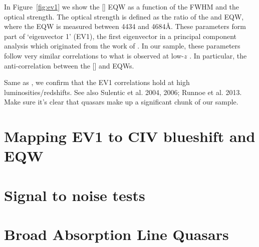 In Figure~\ref{fig:ev1} we show the [] EQW as a function of the \hb FWHM and the optical  strength. 
The optical  strength is defined as the ratio of the  and \hb EQW, where the  EQW is measured between 4434 and 4684\AA.
These parameters form part of `eigenvector 1' (EV1), the first eigenvector in a principal component analysis which originated from the work of \citet{boroson92}.
In our sample, these parameters follow very similar correlations to what is observed at low-$z$ \citep[e.g.][]{shen14}.
In particular, the anti-correlation between the [] and  EQWs.  

Same as \citet{shen16a}, we confirm that the EV1 correlations hold at high luminosities/redshifts. 
See also Sulentic et al. 2004, 2006; Runnoe et al. 2013. 
Make sure it's clear that \citet{shen16a} quasars make up a significant chunk of our sample. 

\section{Mapping EV1 to CIV blueshift and EQW}


\section{Signal to noise tests}


\section{Broad Absorption Line Quasars}

